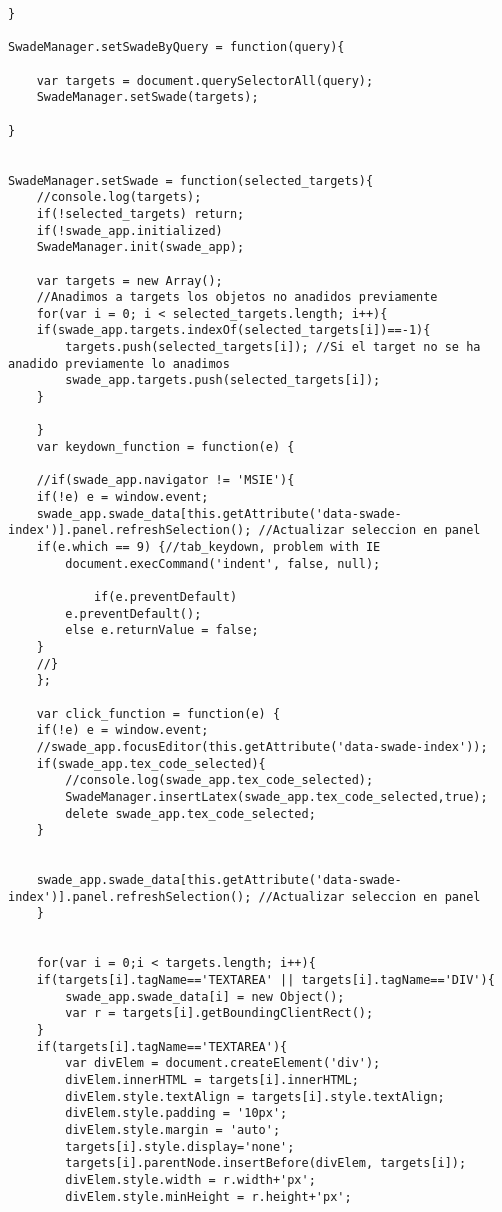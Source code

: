 \begin{lstlisting}
}

SwadeManager.setSwadeByQuery = function(query){

    var targets = document.querySelectorAll(query);
    SwadeManager.setSwade(targets);

}


SwadeManager.setSwade = function(selected_targets){
    //console.log(targets);
    if(!selected_targets) return;
    if(!swade_app.initialized)
	SwadeManager.init(swade_app);

    var targets = new Array();
    //Anadimos a targets los objetos no anadidos previamente
    for(var i = 0; i < selected_targets.length; i++){
	if(swade_app.targets.indexOf(selected_targets[i])==-1){ 
	    targets.push(selected_targets[i]); //Si el target no se ha anadido previamente lo anadimos
	    swade_app.targets.push(selected_targets[i]);
	}

    }
    var keydown_function = function(e) {

	//if(swade_app.navigator != 'MSIE'){
	if(!e) e = window.event;
	swade_app.swade_data[this.getAttribute('data-swade-index')].panel.refreshSelection(); //Actualizar seleccion en panel
	if(e.which == 9) {//tab_keydown, problem with IE 
	    document.execCommand('indent', false, null);
            
            if(e.preventDefault)
		e.preventDefault();
	    else e.returnValue = false;
	}
	//}
    };
    
    var click_function = function(e) {
	if(!e) e = window.event;
	//swade_app.focusEditor(this.getAttribute('data-swade-index'));
	if(swade_app.tex_code_selected){
	    //console.log(swade_app.tex_code_selected);
	    SwadeManager.insertLatex(swade_app.tex_code_selected,true);
	    delete swade_app.tex_code_selected;
	}


	swade_app.swade_data[this.getAttribute('data-swade-index')].panel.refreshSelection(); //Actualizar seleccion en panel
    }


    for(var i = 0;i < targets.length; i++){
	if(targets[i].tagName=='TEXTAREA' || targets[i].tagName=='DIV'){
	    swade_app.swade_data[i] = new Object();
	    var r = targets[i].getBoundingClientRect();
	}
	if(targets[i].tagName=='TEXTAREA'){
	    var divElem = document.createElement('div');
	    divElem.innerHTML = targets[i].innerHTML;
	    divElem.style.textAlign = targets[i].style.textAlign;
	    divElem.style.padding = '10px';
	    divElem.style.margin = 'auto';
	    targets[i].style.display='none';
	    targets[i].parentNode.insertBefore(divElem, targets[i]);
	    divElem.style.width = r.width+'px';
	    divElem.style.minHeight = r.height+'px';


\end{lstlisting}
